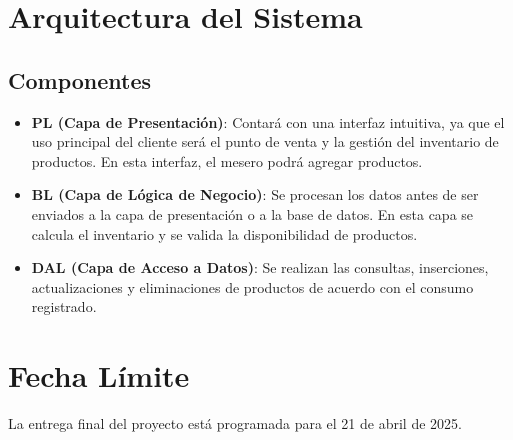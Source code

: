 \documentclass{report}
\begin{document}
\section{Arquitectura del Sistema}
\subsection{Componentes}
\begin{itemize}
\item \textbf{PL (Capa de Presentación)}: Contará con una interfaz intuitiva, ya que el uso principal del cliente será el punto de venta y la gestión del inventario de productos. En esta interfaz, el mesero podrá agregar productos.
\item \textbf{BL (Capa de Lógica de Negocio)}: Se procesan los datos antes de ser enviados a la capa de presentación o a la base de datos. En esta capa se calcula el inventario y se valida la disponibilidad de productos.
\item \textbf{DAL (Capa de Acceso a Datos)}: Se realizan las consultas, inserciones, actualizaciones y eliminaciones de productos de acuerdo con el consumo registrado.
\end{itemize}

\section{Fecha Límite}
La entrega final del proyecto está programada para el 21 de abril de 2025.
\end{document}
